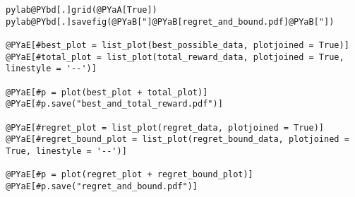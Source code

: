 \begin{Verbatim}[commandchars=@\[\]]
pylab@PYbd[.]grid(@PYaA[True])
pylab@PYbd[.]savefig(@PYaB["]@PYaB[regret_and_bound.pdf]@PYaB["])

@PYaE[#best_plot = list_plot(best_possible_data, plotjoined = True)]
@PYaE[#total_plot = list_plot(total_reward_data, plotjoined = True, linestyle = '--')]

@PYaE[#p = plot(best_plot + total_plot)]
@PYaE[#p.save("best_and_total_reward.pdf")]

@PYaE[#regret_plot = list_plot(regret_data, plotjoined = True)]
@PYaE[#regret_bound_plot = list_plot(regret_bound_data, plotjoined = True, linestyle = '--')]

@PYaE[#p = plot(regret_plot + regret_bound_plot)]
@PYaE[#p.save("regret_and_bound.pdf")]
\end{Verbatim}
